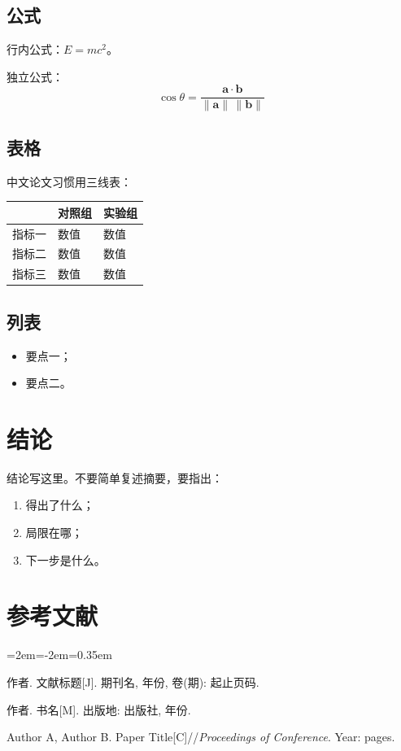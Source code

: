 \documentclass[UTF8,a4paper,11pt]{ctexart}
\begin{document}
\subsection{公式}

行内公式：$E = mc^2$。

独立公式：
\begin{equation}
\cos\theta = \frac{\mathbf{a} \cdot \mathbf{b}}{\lVert \mathbf{a}\rVert \, \lVert \mathbf{b}\rVert}
\end{equation}

\subsection{表格}

中文论文习惯用三线表：

\begin{center}
\begin{tabular}{@{}p{3.2cm}p{4.6cm}p{4.6cm}@{}}
\toprule
 & 对照组 & 实验组 \\
\midrule
指标一 & 数值 & 数值 \\
指标二 & 数值 & 数值 \\
指标三 & 数值 & 数值 \\
\bottomrule
\end{tabular}
\end{center}

\subsection{列表}

\begin{itemize}[leftmargin=2em,itemsep=0.2em]
  \item 要点一；
  \item 要点二。
\end{itemize}

\section{结论}

结论写这里。不要简单复述摘要，要指出：
\begin{enumerate}[leftmargin=2em,itemsep=0.3em]
  \item 得出了什么；
  \item 局限在哪；
  \item 下一步是什么。
\end{enumerate}

\vspace{1.5em}
\section*{参考文献}

\begin{list}{}{\leftmargin=2em\itemindent=-2em\itemsep=0.35em}
\small

\item 作者. 文献标题[J]. 期刊名, 年份, 卷(期): 起止页码.

\item 作者. 书名[M]. 出版地: 出版社, 年份.

\item Author A, Author B. Paper Title[C]//\textit{Proceedings of Conference}. Year: pages.

\end{list}
\end{document}
